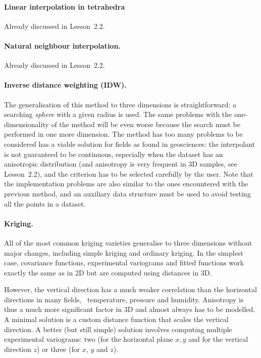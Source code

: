 \paragraph{Linear interpolation in tetrahedra}
Already discussed in Lesson~2.2.

\paragraph{Natural neighbour interpolation.}
Already discussed in Lesson~2.2.

\paragraph{Inverse distance weighting (\textbf{IDW}).}
The generalisation of this method to three dimensions is straightforward: a searching \emph{sphere} with a given radius is used. 
The same problems with the one-dimensionality of the method will be even worse because the search must be performed in one more dimension. 
The method has too many problems to be considered  has a viable solution for fields as found in geosciences: the interpolant is not guaranteed to be continuous, especially when the dataset has an anisotropic distribution (and anisotropy is very frequent in 3D samples, see Lesson~2.2), and the criterion has to be selected carefully by the user.
Note that the implementation problems are also similar to the ones encountered with the previous method, and an auxiliary data structure must be used to avoid testing all the points in a dataset.

\paragraph{Kriging.}
All of the most common kriging varieties generalise to three dimensions without major changes, including simple kriging and ordinary kriging.
In the simplest case, covariance functions, experimental variograms and fitted functions work exactly the same as in 2D but are computed using distances in 3D.

However, the vertical direction has a much weaker correlation than the horizontal directions in many fields, \eg\ temperature, pressure and humidity.
Anisotropy is thus a much more significant factor in 3D and almost always has to be modelled.
A minimal solution is a custom distance function that scales the vertical direction.
A better (but still simple) solution involves computing multiple experimental variograms: two (for the horizontal plane \(x,y\) and for the vertical direction \(z\)) or three (for \(x\), \(y\) and \(z\)).

